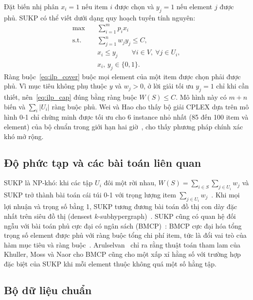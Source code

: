 Đặt biến nhị phân $x_i=1$ nếu item $i$ được chọn và $y_j=1$ nếu element $j$ được phủ. SUKP có thể viết dưới dạng quy hoạch tuyến tính nguyên:
\begin{align}
\max\quad & \sum_{i=1}^{m}p_i x_i \label{eq:ilp_obj}\\
\text{s.t.}\quad & \sum_{j=1}^{n}w_j y_j\le C, \label{eq:ilp_cap}\\
& x_i\le y_j \qquad \forall i\in V,\ \forall j\in U_i, \label{eq:ilp_cover}\\
& x_i,\,y_j\in\{0,1\}. \nonumber
\end{align}
Ràng buộc~\eqref{eq:ilp_cover} buộc mọi element của một item được chọn phải được phủ. Vì mục tiêu không phụ thuộc $y$ và $w_j>0$, ở lời giải tối ưu $y_j=1$ chỉ khi cần thiết, nên~\eqref{eq:ilp_cap} đúng bằng ràng buộc $W(S)\le C$. Mô hình này có $m+n$ biến và $\sum_i|U_i|$ ràng buộc phủ. Wei và Hao cho thấy bộ giải CPLEX dựa trên mô hình 0-1 chỉ chứng minh được tối ưu cho 6 instance nhỏ nhất (85 đến 100 item và element) của bộ chuẩn trong giới hạn hai giờ~\cite{Wei2019}, cho thấy phương pháp chính xác khó mở rộng.

\subsection{Độ phức tạp và các bài toán liên quan}

SUKP là NP-khó: khi các tập $U_i$ đôi một rời nhau, $W(S)=\sum_{i\in S}\sum_{j\in U_i}w_j$ và SUKP trở thành bài toán cái túi 0-1 với trọng lượng item $\sum_{j\in U_i}w_j$~\cite{Goldschmidt1994}. Khi mọi lợi nhuận và trọng số bằng 1, SUKP tương đương bài toán đồ thị con dày đặc nhất trên siêu đồ thị (densest $k$-subhypergraph)~\cite{Arulselvan2014}. SUKP cũng có quan hệ đối ngẫu với bài toán phủ cực đại có ngân sách (BMCP)~\cite{Khuller1999}: BMCP cực đại hóa tổng trọng số element được phủ với ràng buộc tổng chi phí item, tức là đổi vai trò của hàm mục tiêu và ràng buộc~\cite{Zhu2022}. Arulselvan~\cite{Arulselvan2014} chỉ ra rằng thuật toán tham lam của Khuller, Moss và Naor cho BMCP cũng cho một xấp xỉ hằng số với trường hợp đặc biệt của SUKP khi mỗi element thuộc không quá một số hằng tập.

\subsection{Bộ dữ liệu chuẩn}\label{sec:benchmark}

